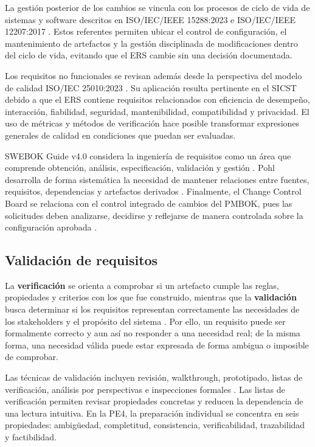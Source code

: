 \documentclass[12pt,a4paper]{article}
\newcommand{\Sigla}{SICST}
\begin{document}
La gestión posterior de los cambios se vincula con los procesos de ciclo de vida de sistemas y software descritos en ISO/IEC/IEEE 15288:2023 e ISO/IEC/IEEE 12207:2017 \cite{r2,r3}. Estos referentes permiten ubicar el control de configuración, el mantenimiento de artefactos y la gestión disciplinada de modificaciones dentro del ciclo de vida, evitando que el ERS cambie sin una decisión documentada.

Los requisitos no funcionales se revisan además desde la perspectiva del modelo de calidad ISO/IEC 25010:2023 \cite{r4}. Su aplicación resulta pertinente en el \Sigla{} debido a que el ERS contiene requisitos relacionados con eficiencia de desempeño, interacción, fiabilidad, seguridad, mantenibilidad, compatibilidad y privacidad. El uso de métricas y métodos de verificación hace posible transformar expresiones generales de calidad en condiciones que puedan ser evaluadas.

SWEBOK Guide v4.0 considera la ingeniería de requisitos como un área que comprende obtención, análisis, especificación, validación y gestión \cite{r6}. Pohl desarrolla de forma sistemática la necesidad de mantener relaciones entre fuentes, requisitos, dependencias y artefactos derivados \cite{r5}. Finalmente, el Change Control Board se relaciona con el control integrado de cambios del PMBOK, pues las solicitudes deben analizarse, decidirse y reflejarse de manera controlada sobre la configuración aprobada \cite{r7}.

\subsection{Validación de requisitos}

La \textbf{verificación} se orienta a comprobar si un artefacto cumple las reglas, propiedades y criterios con los que fue construido, mientras que la \textbf{validación} busca determinar si los requisitos representan correctamente las necesidades de los stakeholders y el propósito del sistema \cite{r1,r5}. Por ello, un requisito puede ser formalmente correcto y aun así no responder a una necesidad real; de la misma forma, una necesidad válida puede estar expresada de forma ambigua o imposible de comprobar.

Las técnicas de validación incluyen revisión, walkthrough, prototipado, listas de verificación, análisis por perspectivas e inspecciones formales \cite{r6,r8}. Las listas de verificación permiten revisar propiedades concretas y reducen la dependencia de una lectura intuitiva. En la PE4, la preparación individual se concentra en seis propiedades: ambigüedad, completitud, consistencia, verificabilidad, trazabilidad y factibilidad.
\end{document}
